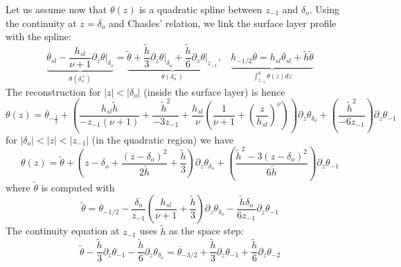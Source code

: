 Let us assume now that  $\theta(z)$ is a quadratic spline between
$z_{-1}$ and $\delta_o$.
Using the continuity at $z=\delta_o$ and Chasles' relation,
we link the surface layer profile with the spline:
\begin{equation}
\underbrace{
    \overline{\theta}_{sl} -
    \frac{h_{sl}}{\nu+1}\left. \partial_z \theta
    \right|_{\delta_o}}_{\theta(\delta_o^{+})}
    =
    \underbrace{
    \widetilde{\theta}
    + \frac{\widetilde{h}}{3}
    \left.\partial_z \theta\right|_{\delta_o}
    + \frac{\widetilde{h}}{6}
	\left.\partial_z \theta\right|_{z_{-1}}}_{
	\theta(\delta_o^{-})}
	,
    ~~~~
	\underbrace{
    h_{-1/2} \overline{\theta} = 
    h_{sl}\overline{\theta}_{sl} +\widetilde{h}
    \widetilde{\theta}}_{
    \int_{z_{-1}}^{0}\theta(z) dz
    }
\end{equation}
The reconstruction for $|z|<|\delta_o|$ (inside the surface layer) is hence
\begin{equation}
    \theta(z) =
    \overline{\theta}_{-\frac{1}{2}}
    +
	\left(\frac{h_{sl}\widetilde{h}}{-z_{-1}(\nu+1)} +
	\frac{\widetilde{h}^2}{-3 z_{-1}}
    +
    \frac{h_{sl}}{\nu}\left(
    \frac{1}{\nu+1} + \left(\frac{z}{h_{sl}}
    \right)^\nu
    \right)\right) \partial_z \theta_{\delta_o}
    +
	\left(\frac{\widetilde{h}^2}{-6 z_{-1}}\right)
    \partial_z \theta_{-1}
\end{equation}
for $|\delta_o| < |z| < |z_{-1}|$
(in the quadratic region) we have
\begin{equation}
    \theta(z) =
        \widetilde{\theta}
        +
        \left(
        z-\delta_o + 
        \frac{(z-\delta_o)^2}{2\widetilde{h}}
        + \frac{\widetilde{h}}{3}
        \right)\partial_z \theta_{\delta_o}
        +
        \left(
        \frac{\widetilde{h}^2 - 
        3(z-\delta_o)^2}{6 \widetilde{h}}
        \right)\partial_z \theta_{-1}
\end{equation}
where $\widetilde{\theta}$ is computed with
\begin{equation}
\label{eq:formulaTildeTheta}
\widetilde{\theta} = \overline{\theta}_{-1/2}
	-\frac{\delta_o}{z_{-1}}\left(
\frac{h_{sl}}{\nu+1} + \frac{\widetilde{h}}{3}
\right)\partial_z \theta_{\delta_o}
	- \frac{\widetilde{h}\delta_o}{6z_{-1}}
\partial_z \theta_{-1}
\end{equation}
The continuity equation at $z_{-1}$
uses $\widetilde{h}$
as the space step:
\begin{equation}
    \widetilde{\theta}
    - \frac{\widetilde{h}}{3}
    \partial_z \theta_{-1}
    - \frac{\widetilde{h}}{6}
    \partial_z \theta_{\delta_o}
    = \overline{\theta}_{-3/2}
    + \frac{\widetilde{h}}{3}
    \partial_z \theta_{-1}
    + \frac{\widetilde{h}}{6}
    \partial_z \theta_{-2}
\end{equation}
